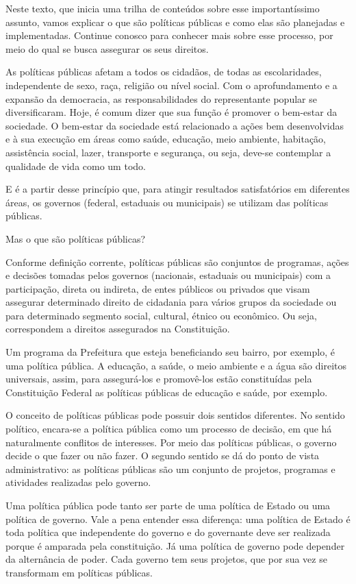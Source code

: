 \documentclass[
   article,       
   12pt,          
   oneside,       
   a4paper,       
   english,       
   brazil,        
   sumario=tradicional
   ]{abntex2}
\begin{document}
Neste texto, que inicia uma trilha de conteúdos sobre esse importantíssimo assunto, vamos explicar o que são políticas públicas e como elas são planejadas e implementadas. Continue conosco para conhecer mais sobre esse processo, por meio do qual se busca assegurar os seus direitos.

As políticas públicas afetam a todos os cidadãos, de todas as escolaridades, independente de sexo, raça, religião ou nível social. Com o aprofundamento e a expansão da democracia, as responsabilidades do representante popular se diversificaram. Hoje, é comum dizer que sua função é promover o bem-estar da sociedade. O bem-estar da sociedade está relacionado a ações bem desenvolvidas e à sua execução em áreas como saúde, educação, meio ambiente, habitação, assistência social, lazer, transporte e segurança, ou seja, deve-se contemplar a qualidade de vida como um todo.

E é a partir desse princípio que, para atingir resultados satisfatórios em diferentes áreas, os governos (federal, estaduais ou municipais) se utilizam das políticas públicas.

Mas o que são políticas públicas?

Conforme definição corrente, políticas públicas são conjuntos de programas, ações e decisões tomadas pelos governos (nacionais, estaduais ou municipais) com a participação, direta ou indireta, de entes públicos ou privados que visam assegurar determinado direito de cidadania para vários grupos da sociedade ou para determinado segmento social, cultural, étnico ou econômico. Ou seja, correspondem a direitos assegurados na Constituição.

Um programa da Prefeitura que esteja beneficiando seu bairro, por exemplo, é uma política pública. A educação, a saúde, o meio ambiente e a água são direitos universais, assim, para assegurá-los e promovê-los estão constituídas pela Constituição Federal as políticas públicas de educação e saúde, por exemplo.

O conceito de políticas públicas pode possuir dois sentidos diferentes. No sentido político, encara-se a política pública como um processo de decisão, em que há naturalmente conflitos de interesses. Por meio das políticas públicas, o governo decide o que fazer ou não fazer. O segundo sentido se dá do ponto de vista administrativo: as políticas públicas são um conjunto de projetos, programas e atividades realizadas pelo governo.

Uma política pública pode tanto ser parte de uma política de Estado ou uma política de governo. Vale a pena entender essa diferença: uma política de Estado é toda política que independente do governo e do governante deve ser realizada porque é amparada pela constituição. Já uma política de governo pode depender da alternância de poder. Cada governo tem seus projetos, que por sua vez se transformam em políticas públicas.
\end{document}
